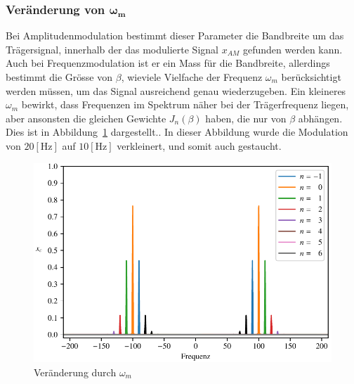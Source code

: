 \subsubsection{Veränderung von $\bm{\omega_m}$}
Bei Amplitudenmodulation bestimmt dieser Parameter
die Bandbreite um das Trägersignal, innerhalb
der das modulierte Signal \(x_{AM}\) gefunden werden kann.
Auch bei Frequenzmodulation ist er ein Mass für die Bandbreite,
allerdings bestimmt die Grösse von $\beta$, wieviele Vielfache
der Frequenz $\omega_m$ berücksichtigt werden müssen, um das
Signal ausreichend genau wiederzugeben.
Ein kleineres $\omega_m$ bewirkt, dass Frequenzen im Spektrum näher
bei der Trägerfrequenz liegen, aber ansonsten die gleichen
Gewichte $J_n(\beta)$ haben, die nur von $\beta$ abhängen.
Dies ist in Abbildung~\ref{fig:fm:fm_10} dargestellt.. 
In dieser Abbildung wurde die Modulation von \(20 [\text{Hz}]\) auf
\( 10[\text{Hz}]\) verkleinert, und somit auch gestaucht. 
\begin{figure}[h]
	\centering
	\includegraphics{papers/fm/images/fm10.pdf}
	\caption{Veränderung durch \(\omega_m\)}
	\label{fig:fm:fm_10}
\end{figure}






